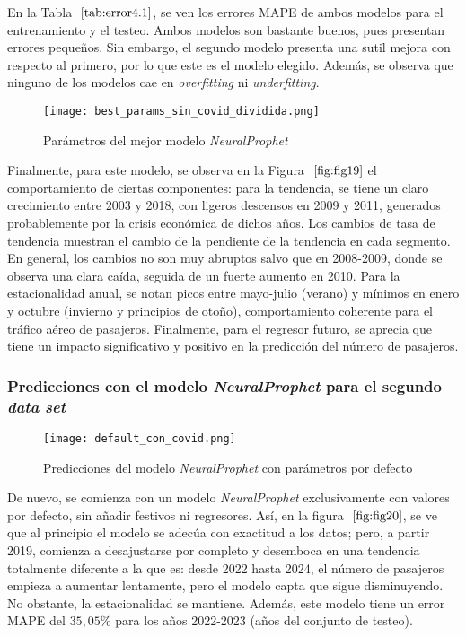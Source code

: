 \documentclass[12pt,twoside]{article}
\begin{document}
En la Tabla $~\ref{tab:error4.1}$, se ven los errores MAPE de ambos modelos para el entrenamiento y el testeo. Ambos modelos son bastante buenos, pues presentan errores pequeños. Sin embargo, el segundo modelo presenta una sutil mejora con respecto al primero, por lo que este es el modelo elegido. Además, se observa que ninguno de los modelos cae en \textit{overfitting} ni \textit{underfitting}.

\begin{figure}[h]
    \centering
    \texttt{[image: best\_params\_sin\_covid\_dividida.png]}
    \caption{Parámetros del mejor modelo \textit{NeuralProphet}} 
    \label{fig:fig19}
\end{figure}

Finalmente, para este modelo, se observa en la Figura $~\ref{fig:fig19}$ el comportamiento de ciertas componentes: para la tendencia, se tiene un claro crecimiento entre 2003 y 2018, con ligeros descensos en 2009 y 2011, generados probablemente por la crisis económica de dichos años. Los cambios de tasa de tendencia muestran el cambio de la pendiente de la tendencia en cada segmento. En general, los cambios no son muy abruptos salvo que en 2008-2009, donde se observa una clara caída, seguida de un fuerte aumento en 2010. Para la estacionalidad anual, se notan picos entre mayo-julio (verano) y mínimos en enero y octubre (invierno y principios de otoño), comportamiento coherente para el tráfico aéreo de pasajeros. Finalmente, para el regresor futuro, se aprecia que tiene un impacto significativo y positivo en la predicción del número de pasajeros.


\subsubsection{Predicciones con el modelo \textit{NeuralProphet} para el segundo \textit{data set}}\label{sec:33}

\begin{figure}[h]
    \centering
    \texttt{[image: default\_con\_covid.png]}
    \caption{Predicciones del modelo \textit{NeuralProphet} con parámetros por defecto} 
    \label{fig:fig20}
\end{figure}

De nuevo, se comienza con un modelo \textit{NeuralProphet} exclusivamente con valores por defecto, sin añadir festivos ni regresores. Así, en la figura $~\ref{fig:fig20}$, se ve que al principio el modelo se adecúa con exactitud a los datos; pero, a partir 2019, comienza a desajustarse por completo y desemboca en una tendencia totalmente diferente a la que es: desde 2022 hasta 2024, el número de pasajeros empieza a aumentar lentamente, pero el modelo capta que sigue disminuyendo. No obstante, la estacionalidad se mantiene. Además, este modelo tiene un error MAPE del $35,05\%$ para los años 2022-2023 (años del conjunto de testeo).
\end{document}

